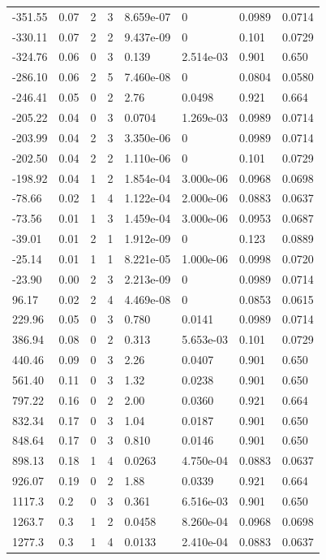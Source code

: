 \documentclass[preview]{standalone}
\begin{document}
{{\begin{tabular}{L{1.2cm}C{1.2cm} C{0.3cm}C{0.5cm} C{1.4cm}C{1.4cm} C{1.4cm}C{1.4cm}}
  -351.55  &  0.07  & 2     &  3 &  8.659e-07  & 0  & 0.0989 &  0.0714   \\ 
  -330.11  &  0.07  & 2     &  2 &  9.437e-09  & 0  & 0.101 &  0.0729   \\ 
  -324.76  &  0.06  & 0     &  3 &  0.139  & 2.514e-03  & 0.901 &  0.650   \\ 
  -286.10  &  0.06  & 2     &  5 &  7.460e-08  & 0  & 0.0804 &  0.0580   \\ 
  -246.41  &  0.05  & 0     &  2 &  2.76  & 0.0498  & 0.921 &  0.664   \\ 
  -205.22  &  0.04  & 0     &  3 &  0.0704  & 1.269e-03  & 0.0989 &  0.0714   \\ 
  -203.99  &  0.04  & 2     &  3 &  3.350e-06  & 0  & 0.0989 &  0.0714   \\ 
  -202.50  &  0.04  & 2     &  2 &  1.110e-06  & 0  & 0.101 &  0.0729   \\ 
  -198.92  &  0.04  & 1     &  2 &  1.854e-04  & 3.000e-06  & 0.0968 &  0.0698   \\ 
  -78.66  &  0.02  & 1     &  4 &  1.122e-04  & 2.000e-06  & 0.0883 &  0.0637   \\ 
  -73.56  &  0.01  & 1     &  3 &  1.459e-04  & 3.000e-06  & 0.0953 &  0.0687   \\ 
  -39.01  &  0.01  & 2     &  1 &  1.912e-09  & 0  & 0.123 &  0.0889   \\ 
  -25.14  &  0.01  & 1     &  1 &  8.221e-05  & 1.000e-06  & 0.0998 &  0.0720   \\ 
  -23.90  &  0.00  & 2     &  3 &  2.213e-09  & 0  & 0.0989 &  0.0714   \\ 
  96.17  &  0.02  & 2     &  4 &  4.469e-08  & 0  & 0.0853 &  0.0615   \\ 
  229.96  &  0.05  & 0     &  3 &  0.780  & 0.0141  & 0.0989 &  0.0714   \\ 
  386.94  &  0.08  & 0     &  2 &  0.313  & 5.653e-03  & 0.101 &  0.0729   \\ 
  440.46  &  0.09  & 0     &  3 &  2.26  & 0.0407  & 0.901 &  0.650   \\ 
  561.40  &  0.11  & 0     &  3 &  1.32  & 0.0238  & 0.901 &  0.650   \\ 
  797.22  &  0.16  & 0     &  2 &  2.00  & 0.0360  & 0.921 &  0.664   \\ 
  832.34  &  0.17  & 0     &  3 &  1.04  & 0.0187  & 0.901 &  0.650   \\ 
  848.64  &  0.17  & 0     &  3 &  0.810  & 0.0146  & 0.901 &  0.650   \\ 
  898.13  &  0.18  & 1     &  4 &  0.0263  & 4.750e-04  & 0.0883 &  0.0637   \\ 
  926.07  &  0.19  & 0     &  2 &  1.88  & 0.0339  & 0.921 &  0.664   \\ 
  1117.3  &   0.2  & 0     &  3 &  0.361  & 6.516e-03  & 0.901 &  0.650   \\ 
  1263.7  &   0.3  & 1     &  2 &  0.0458  & 8.260e-04  & 0.0968 &  0.0698   \\ 
  1277.3  &   0.3  & 1     &  4 &  0.0133  & 2.410e-04  & 0.0883 &  0.0637   \\ 
\hline 
\end{tabular} 

}}
\end{document}
